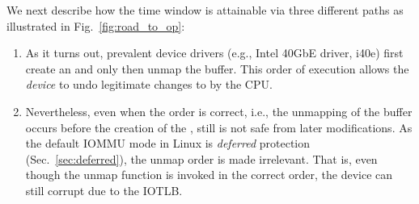 We next describe how the time window is attainable via three different paths as illustrated in Fig.~\ref{fig:road_to_op}: 


\begin{enumerate}[label=(\roman*),wide, labelwidth=!, labelindent=0pt]

\item As it turns out, prevalent device drivers (e.g., Intel 40GbE driver, i40e) first create an \skb{} and only then unmap the buffer. This order of execution allows the \emph{device} to undo legitimate changes to \shinfo{} by the CPU. 

\item Nevertheless, even when the order is correct, i.e., the unmapping of the buffer occurs before the creation of the \skb{}, still \shinfo{} is not safe from later modifications. As the default IOMMU mode in Linux is \emph{deferred} protection (Sec.~\ref{sec:deferred}), the unmap order is made irrelevant. That is, even though the unmap function is invoked in the correct order, the device can still corrupt \shinfo{} due to the IOTLB.  


\end{enumerate}
